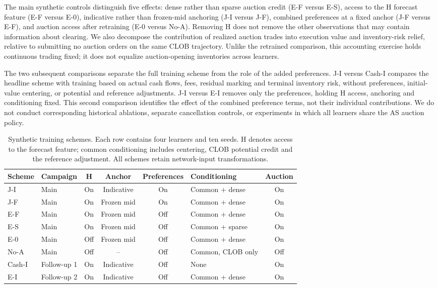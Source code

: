 \documentclass[11pt]{article}
\begin{document}
The main synthetic controls distinguish five effects: dense rather than sparse auction credit (E-F versus E-S), access to the H forecast feature (E-F versus E-0), indicative rather than frozen-mid anchoring (J-I versus J-F), combined preferences at a fixed anchor (J-F versus E-F), and auction access after retraining (E-0 versus No-A). Removing H does not remove the other observations that may contain information about clearing. We also decompose the contribution of realized auction trades into execution value and inventory-risk relief, relative to submitting no auction orders on the same CLOB trajectory. Unlike the retrained comparison, this accounting exercise holds continuous trading fixed; it does not equalize auction-opening inventories across learners.\vspace{0.5em}

The two subsequent comparisons separate the full training scheme from the role of the added preferences. J-I versus Cash-I compares the headline scheme with training based on actual cash flows, fees, residual marking and terminal inventory risk, without preferences, initial-value centering, or potential and reference adjustments. J-I versus E-I removes only the preferences, holding H access, anchoring and conditioning fixed. This second comparison identifies the effect of the combined preference terms, not their individual contributions. We do not conduct corresponding historical ablations, separate cancellation controls, or experiments in which all learners share the AS auction policy.\vspace{0.5em}

\begin{table}[ht!]


\centering
\setlength{\tabcolsep}{4pt}
\begin{tabular}{llccclc}
\toprule
\textbf{Scheme} & \textbf{Campaign} & \textbf{H} & \textbf{Anchor} & \textbf{Preferences} & \textbf{Conditioning} & \textbf{Auction} \\
\midrule
J-I & Main & On & Indicative & On & Common + dense & On \\
J-F & Main & On & Frozen mid & On & Common + dense & On \\
E-F & Main & On & Frozen mid & Off & Common + dense & On \\
E-S & Main & On & Frozen mid & Off & Common + sparse & On \\
E-0 & Main & Off & Frozen mid & Off & Common + dense & On \\
No-A & Main & Off & -- & Off & Common, CLOB only & Off \\
Cash-I & Follow-up 1 & On & Indicative & Off & None & On \\
E-I & Follow-up 2 & On & Indicative & Off & Common + dense & On \\
\bottomrule
\end{tabular}
\caption{Synthetic training schemes. Each row contains four learners and ten seeds. H denotes access to the forecast feature; common conditioning includes centering, CLOB potential credit and the reference adjustment. All schemes retain network-input transformations.}
\label{tab:treatment_specification}
\end{table}
\end{document}

